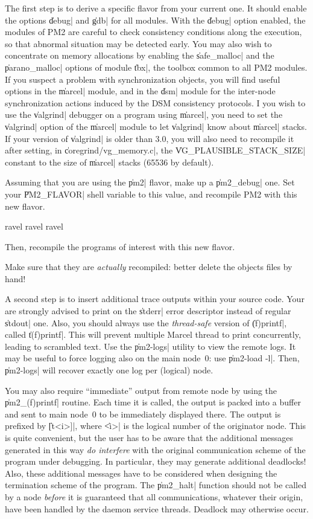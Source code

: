 The first step is to derive a specific flavor from your current one.
It should enable the options \|debug| and \|gdb| for all modules. With
the \|debug| option enabled, the modules of PM2 are careful to check
consistency conditions along the execution, so that abnormal situation
may be detected early. You may also wish to concentrate on memory
allocations by enabling the \|safe_malloc| and the \|parano_malloc|
options of module \|tbx|, the toolbox common to all PM2 modules. If
you suspect a problem with synchronization objects, you will find
useful options in the \|marcel| module, and in the \|dsm| module for
the inter-node synchronization actions induced by the DSM consistency
protocols. I you wish to use the \|valgrind| debugger on a program using
\|marcel|, you need to set the \|valgrind| option of the \|marcel|
module to let \|valgrind| know about \|marcel| stacks. If your version
of \|valgrind| is older than 3.0, you will also need to recompile it
after setting, in \|coregrind/vg_memory.c|, the
\|VG_PLAUSIBLE_STACK_SIZE| constant to the size of \|marcel| stacks
(65536 by default).

Assuming that you are using the \|pm2| flavor, make up a
\|pm2_debug| one. Set your \|PM2_FLAVOR| shell variable to this value,
and recompile PM2 with this new flavor. 
\begin{shell}
ravel%
ravel%
ravel%
\end{shell}
Then, recompile the programs of interest with this new flavor. 

\begin{warning}
  Make sure that they are \emph{actually} recompiled: better delete
  the objects files by hand!
\end{warning}


A second step is to insert additional trace outputs within your source
code. Your are strongly advised to print on the \|stderr| error
descriptor instead of regular \|stdout| one. Also, you should always
use the \emph{thread-safe} version of \|(f)printf|, called \|t(f)printf|.
This will prevent multiple Marcel thread to print concurrently,
leading to scrambled text. Use the \|pm2-logs| utility to view the
remote logs. It may be useful to force logging also on the main
node~0: use \|pm2-load -l|. Then, \|pm2-logs| will recover exactly one
log per (logical) node.

You may also require ``immediate'' output from remote node by using
the \|pm2_(f)printf| routine. Each time it is called, the output is
packed into a buffer and sent to main node~0 to be immediately
displayed there. The output is prefixed by \|[t<i>]|, where \|<i>| is
the logical number of the originator node.  This is quite convenient, but
the user has to be aware that the additional messages generated in
this way \emph{do interfere} with the original communication scheme of
the program under debugging. In particular, they may generate
additional deadlocks! Also, these additional messages have to be
considered when designing the termination scheme of the program. The
\|pm2_halt| function should not be called by a node \emph{before} it
is guaranteed that all communications, whatever their origin, have
been handled by the daemon service threads. Deadlock may otherwise
occur.

